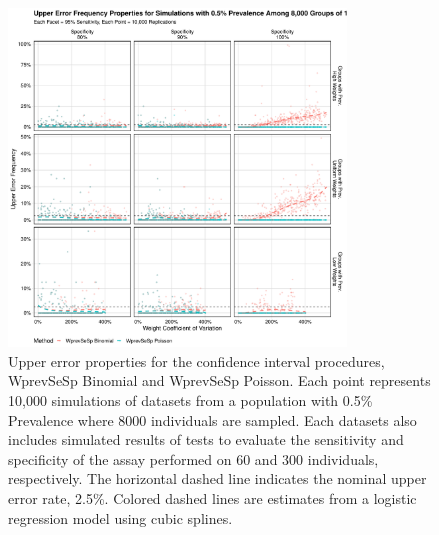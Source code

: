 \documentclass[AMA,STIX1COL]{WileyNJD-v2}
\begin{document}
\begin{figure}
\centering
\includegraphics[width=0.8\textwidth]{figures/imperfect_upper_error_frequency_8000_groups_0_005_prev.pdf}
\caption{Upper error properties for the confidence interval procedures, WprevSeSp Binomial and WprevSeSp Poisson.
Each point represents 10,000 simulations of datasets from a population with 0.5\% Prevalence where 8000 individuals are sampled.
Each datasets also includes simulated results of tests to evaluate the sensitivity and specificity of the assay performed on 60 and 300 individuals, respectively.
The horizontal dashed line indicates the nominal upper error rate, 2.5\%.
Colored dashed lines are estimates from a logistic regression model using cubic splines.}
\label{fig:imperfect_upper_error_frequency_8000_groups_0_005_prev}
\end{figure}
\end{document}
